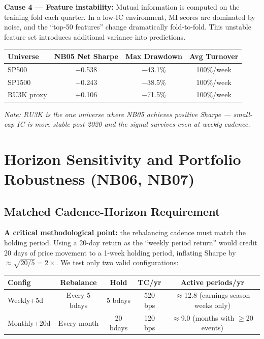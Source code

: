 \documentclass[11pt,a4paper]{article}
\begin{document}
\textbf{Cause 4 --- Feature instability:}
Mutual information is computed on the training fold each quarter. In a low-IC environment, MI scores are dominated by noise, and the ``top-50 features'' change dramatically fold-to-fold. This unstable feature set introduces additional variance into predictions.

\begin{center}
\begin{tabular}{lccc}
\toprule
Universe & NB05 Net Sharpe & Max Drawdown & Avg Turnover\\
\midrule
SP500      & $-$0.538 & $-$43.1\% & 100\%/week\\
SP1500     & $-$0.243 & $-$38.5\% & 100\%/week\\
RU3K proxy & +0.106   & $-$71.5\% & 100\%/week\\
\bottomrule
\end{tabular}
\end{center}

\textit{Note: RU3K is the one universe where NB05 achieves positive Sharpe --- small-cap IC is more stable post-2020 and the signal survives even at weekly cadence.}

\section{Horizon Sensitivity and Portfolio Robustness (NB06, NB07)}

\subsection{Matched Cadence-Horizon Requirement}

\begin{callout}
\textbf{A critical methodological point:} the rebalancing cadence must match the holding period. Using a 20-day return as the ``weekly period return'' would credit 20 days of price movement to a 1-week holding period, inflating Sharpe by $\approx\sqrt{20/5} = 2\times$. We test only two valid configurations:
\begin{center}
\begin{tabular}{lcccc}
\toprule
Config & Rebalance & Hold & TC/yr & Active periods/yr\\
\midrule
Weekly+5d   & Every 5 bdays & 5 bdays  & 520 bps & $\approx$12.8 (earnings-season weeks only)\\
Monthly+20d & Every month   & 20 bdays & 120 bps & $\approx$9.0 (months with $\ge$20 events)\\
\bottomrule
\end{tabular}
\end{center}
\end{callout}
\end{document}
